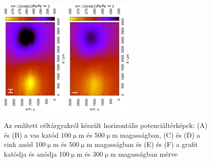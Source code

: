 \begin{figure}
\includegraphics[width=0.3\textwidth, angle=-90]{img/mérések/grafit_h_100.eps}
\includegraphics[width=0.3\textwidth, angle=-90]{img/mérések/grafit_h_300.eps}

\caption{Az említett céltárgyakról készült horizontális potenciáltérképek:
(A) és (B) a vas katód 100$\upmu$m és 500$\upmu$m magasságban, (C) és (D) a cink anód 100$\upmu$m és 500$\upmu$m magasságban és (E) és (F) a grafit katódja és anódja 100$\upmu$m és 300$\upmu$m magasságban mérve}
\label{fig:horizontális}
\end{figure}


